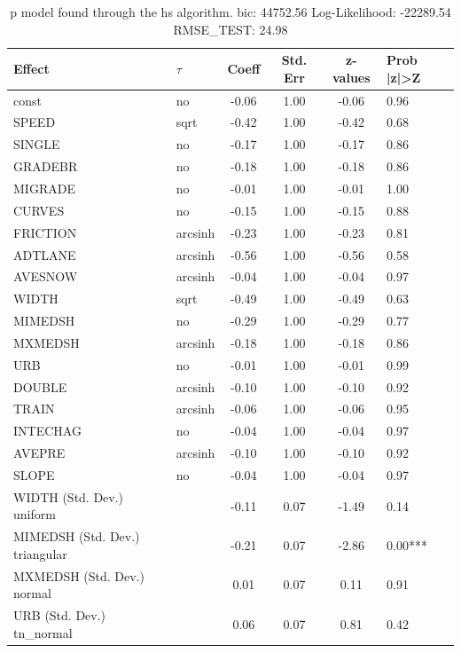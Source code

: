 \begin{table}
	\caption{p model found through the hs algorithm. bic: 44752.56 Log-Likelihood: -22289.54 RMSE_TEST: 24.98}
	\begin{center}
		\begin{tabular}{|l|l|c|c|c|l|}
			\hline
			Effect & $\tau$ & Coeff & Std. Err & z-values & Prob |z|>Z \\
			\hline
			const & no & -0.06 & 1.00 & -0.06 & 0.96 \\
			\hline
			SPEED & sqrt & -0.42 & 1.00 & -0.42 & 0.68 \\
			\hline
			SINGLE & no & -0.17 & 1.00 & -0.17 & 0.86 \\
			\hline
			GRADEBR & no & -0.18 & 1.00 & -0.18 & 0.86 \\
			\hline
			MIGRADE & no & -0.01 & 1.00 & -0.01 & 1.00 \\
			\hline
			CURVES & no & -0.15 & 1.00 & -0.15 & 0.88 \\
			\hline
			FRICTION & arcsinh & -0.23 & 1.00 & -0.23 & 0.81 \\
			\hline
			ADTLANE & arcsinh & -0.56 & 1.00 & -0.56 & 0.58 \\
			\hline
			AVESNOW & arcsinh & -0.04 & 1.00 & -0.04 & 0.97 \\
			\hline
			WIDTH & sqrt & -0.49 & 1.00 & -0.49 & 0.63 \\
			\hline
			MIMEDSH & no & -0.29 & 1.00 & -0.29 & 0.77 \\
			\hline
			MXMEDSH & arcsinh & -0.18 & 1.00 & -0.18 & 0.86 \\
			\hline
			URB & no & -0.01 & 1.00 & -0.01 & 0.99 \\
			\hline
			DOUBLE & arcsinh & -0.10 & 1.00 & -0.10 & 0.92 \\
			\hline
			TRAIN & arcsinh & -0.06 & 1.00 & -0.06 & 0.95 \\
			\hline
			INTECHAG & no & -0.04 & 1.00 & -0.04 & 0.97 \\
			\hline
			AVEPRE & arcsinh & -0.10 & 1.00 & -0.10 & 0.92 \\
			\hline
			SLOPE & no & -0.04 & 1.00 & -0.04 & 0.97 \\
			\hline
			WIDTH (Std. Dev.) uniform &  & -0.11 & 0.07 & -1.49 & 0.14 \\
			\hline
			MIMEDSH (Std. Dev.) triangular &  & -0.21 & 0.07 & -2.86 & 0.00*** \\
			\hline
			MXMEDSH (Std. Dev.) normal &  & 0.01 & 0.07 & 0.11 & 0.91 \\
			\hline
			URB (Std. Dev.) tn_normal &  & 0.06 & 0.07 & 0.81 & 0.42 \\

\end{tabular}
\end{center}
\end{table}
